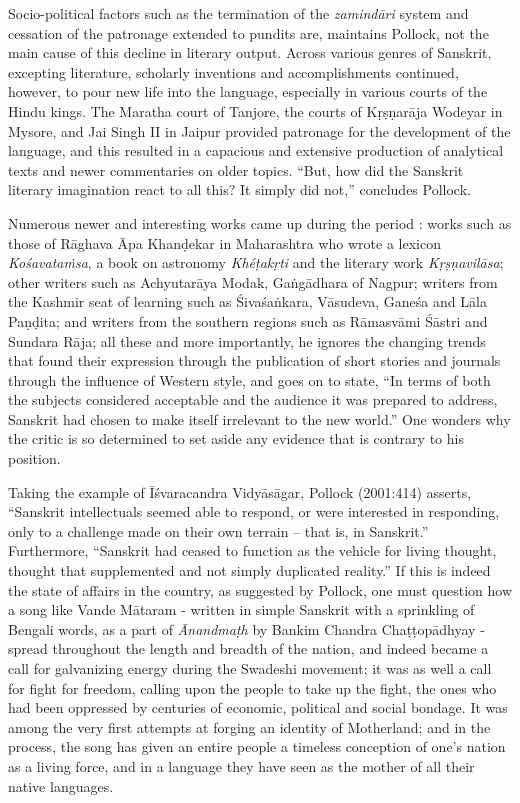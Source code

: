 Socio-political factors such as the termination of the {\sl zamindāri} system and cessation of the patronage extended to pundits are, maintains Pollock, not the main cause of this decline in literary output. Across various genres of Sanskrit, excepting literature, scholarly inventions and accomplishments continued, however, to pour new life into the language, especially in various courts of the Hindu kings. The Maratha court of Tanjore, the courts of Kṛṣṇarāja Wodeyar in Mysore, and Jai Singh II in Jaipur provided patronage for the development of the language, and this resulted in a capacious and extensive production of analytical texts and newer commentaries on older topics. “But, how did the Sanskrit literary imagination react to all this? It simply did not,” concludes Pollock.  

Numerous newer and interesting works came up during the period : works such as those of Rāghava Āpa Khanḍekar in Maharashtra who wrote  a lexicon {\sl Kośavataṁsa}, a book on astronomy {\sl Khéṭakṛti} and the literary work {\sl Kṛṣṇavilāsa}; other writers such as Achyutarāya Modak, Gaṅgādhara of Nagpur; writers from the Kashmir seat of learning such as Śivaśaṅkara, Vāsudeva, Ganeśa and Lāla Paṇḍita; and writers from the southern regions such as Rāmasvāmi Śāstri and  Sundara Rāja; all these and more importantly, he ignores the changing trends that found their expression through the publication of short stories and journals through the influence of Western style, and goes on to state, “In terms of both the subjects considered acceptable and the audience it was prepared to address, Sanskrit had chosen to make itself irrelevant to the new world.” One wonders why the critic is so determined to set aside any evidence that is contrary to his position.

Taking the example of Īśvaracandra Vidyāsāgar, Pollock (2001:414) asserts, “Sanskrit intellectuals seemed able to respond, or were interested in responding, only to a challenge made on their own terrain – that is, in Sanskrit.” Furthermore, “Sanskrit had ceased to function as the vehicle for living thought, thought that supplemented and not simply duplicated reality.” If this is indeed the state of affairs in the country, as suggested by Pollock, one must question how a song like Vande Mātaram - written in simple Sanskrit with a sprinkling of Bengali words, as a part of {\sl Ānandmaṭh} by Bankim Chandra Chaṭṭopādhyay - spread throughout the length and breadth of the nation, and indeed became a call for galvanizing energy during the Swadeshi movement; it was as well a call for fight for freedom, calling upon the people to take up the fight, the ones who had been oppressed by centuries of economic, political and social bondage. It was among the very first attempts at forging an identity of Motherland; and in the process, the song has given an entire people a timeless conception of one’s nation as a living force, and in a language they have seen as the mother of all their native languages. 

